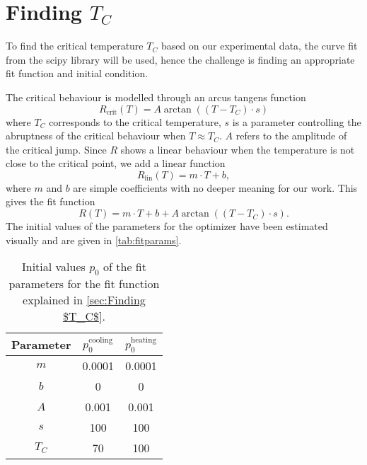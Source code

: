 \section{Finding $T_C$}
\label{sec:Finding $T_C$}
To find the critical temperature $T_C$ based on our experimental data, the curve fit from the scipy
library will be used, hence the challenge is finding an appropriate fit function and initial
condition.

The critical behaviour is modelled through an arcus tangens function
\begin{equation}
  R_\text{crit}(T) = A \arctan\left( (T - T_C) \cdot s\right)
\end{equation}
where $T_C$ corresponds to the critical temperature, $s$ is a parameter controlling the abruptness
of the critical behaviour when $T \approx T_C$. $A$ refers to the amplitude of the critical jump.
Since $R$ shows a linear behaviour when the temperature is not close to the critical point, we add
a linear function
\begin{equation}
  R_\text{lin}(T) = m\cdot T + b,
\end{equation}
where $m$ and $b$ are simple coefficients with no deeper meaning for our work. This gives the fit
function
\begin{equation}
  R(T) = m\cdot T + b + A \arctan\left( (T - T_C) \cdot s\right).
\end{equation}
The initial values of the parameters for the optimizer have been estimated visually and are given in
\autoref{tab:fitparams}.

\begin{table}
  \centering
  \caption{Initial values $p_0$ of the fit parameters for the fit function explained in
  \autoref{sec:Finding $T_C$}.}
  \label{tab:fitparams}
  \begin{tabular}{c c c}
    Parameter & $p_0^\text{cooling}$ & $p_0^\text{heating}$ \\
    \hline
    $m$ & 0.0001 & 0.0001 \\
    $b$ & 0 & 0 \\ 
    $A$ & 0.001 & 0.001 \\
    $s$ & 100 & 100 \\
    $T_C$ & 70 & 100
  \end{tabular}
\end{table}

